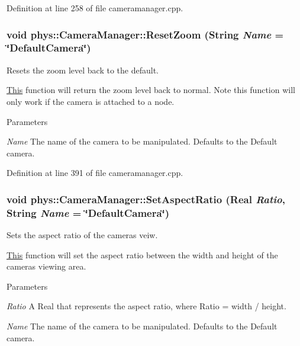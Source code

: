 Definition at line 258 of file cameramanager.cpp.

\hypertarget{classphys_1_1CameraManager_a1cfaf4720fa9af7c0f234d6a2f26e179}{
\subsubsection[{ResetZoom}]{\setlength{\rightskip}{0pt plus 5cm}void phys::CameraManager::ResetZoom ({\bf String} {\em Name} = {\ttfamily \char`\"{}DefaultCamera\char`\"{}})}}
\label{d9/d91/classphys_1_1CameraManager_a1cfaf4720fa9af7c0f234d6a2f26e179}


Resets the zoom level back to the default. 

\hyperlink{structThis}{This} function will return the zoom level back to normal. Note this function will only work if the camera is attached to a node. 
\begin{DoxyParams}{Parameters}
\item[{\em Name}]The name of the camera to be manipulated. Defaults to the Default camera. \end{DoxyParams}


Definition at line 391 of file cameramanager.cpp.

\hypertarget{classphys_1_1CameraManager_af16862039fffd900b9c7acc20527cac8}{
\subsubsection[{SetAspectRatio}]{\setlength{\rightskip}{0pt plus 5cm}void phys::CameraManager::SetAspectRatio ({\bf Real} {\em Ratio}, \/  {\bf String} {\em Name} = {\ttfamily \char`\"{}DefaultCamera\char`\"{}})}}
\label{d9/d91/classphys_1_1CameraManager_af16862039fffd900b9c7acc20527cac8}


Sets the aspect ratio of the cameras veiw. 

\hyperlink{structThis}{This} function will set the aspect ratio between the width and height of the cameras viewing area. 
\begin{DoxyParams}{Parameters}
\item[{\em Ratio}]A Real that represents the aspect ratio, where Ratio = width / height. \item[{\em Name}]The name of the camera to be manipulated. Defaults to the Default camera. \end{DoxyParams}


